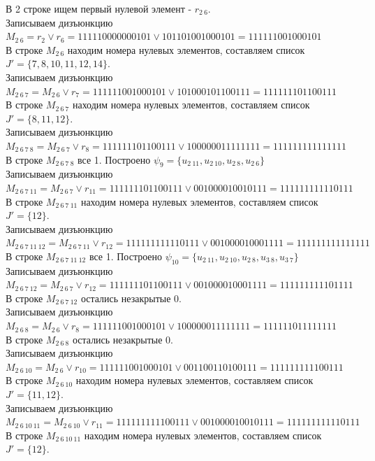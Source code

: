 \documentclass[a4paper,12pt]{article}
\begin{document}
\noindent
В 2 строке ищем первый нулевой элемент - $r_{2\ 6}$.\\
Записываем дизъюнкцию $M_{2\ 6} = r_{2}\lor r_{6} = 111110000000101 \lor 101101001000101 = 111111001000101$\\
В строке $M_{2\ 6}$ находим номера нулевых элементов, составляем список $J' = \{7, 8, 10, 11, 12, 14\}$.\\
Записываем дизъюнкцию $M_{2\ 6\ 7} = M_{2\ 6}\lor r_{7} = 111111001000101 \lor 101000101100111 = 111111101100111$\\
В строке $M_{2\ 6\ 7}$ находим номера нулевых элементов, составляем список $J' = \{8, 11, 12\}$.\\
Записываем дизъюнкцию $M_{2\ 6\ 7\ 8} = M_{2\ 6\ 7}\lor r_{8} = 111111101100111 \lor 100000011111111 = 111111111111111$\\
В строке $M_{2\ 6\ 7\ 8}$ все 1. Построено $\psi_{9} = \{u_{2\ 11},u_{2\ 10},u_{2\ 8},u_{2\ 6}\}$\\
Записываем дизъюнкцию $M_{2\ 6\ 7\ 11} = M_{2\ 6\ 7}\lor r_{11} = 111111101100111 \lor 001000010010111 = 111111111110111$\\
В строке $M_{2\ 6\ 7\ 11}$ находим номера нулевых элементов, составляем список $J' = \{12\}$.\\
Записываем дизъюнкцию $M_{2\ 6\ 7\ 11\ 12} = M_{2\ 6\ 7\ 11}\lor r_{12} = 111111111110111 \lor 001000010001111 = 111111111111111$\\
В строке $M_{2\ 6\ 7\ 11\ 12}$ все 1. Построено $\psi_{10} = \{u_{2\ 11},u_{2\ 10},u_{2\ 8},u_{3\ 8},u_{3\ 7}\}$\\
Записываем дизъюнкцию $M_{2\ 6\ 7\ 12} = M_{2\ 6\ 7}\lor r_{12} = 111111101100111 \lor 001000010001111 = 111111111101111$\\
В строке $M_{2\ 6\ 7\ 12}$ остались незакрытые 0.\\
Записываем дизъюнкцию $M_{2\ 6\ 8} = M_{2\ 6}\lor r_{8} = 111111001000101 \lor 100000011111111 = 111111011111111$\\
В строке $M_{2\ 6\ 8}$ остались незакрытые 0.\\
Записываем дизъюнкцию $M_{2\ 6\ 10} = M_{2\ 6}\lor r_{10} = 111111001000101 \lor 001100110100111 = 111111111100111$\\
В строке $M_{2\ 6\ 10}$ находим номера нулевых элементов, составляем список $J' = \{11, 12\}$.\\
Записываем дизъюнкцию $M_{2\ 6\ 10\ 11} = M_{2\ 6\ 10}\lor r_{11} = 111111111100111 \lor 001000010010111 = 111111111110111$\\
В строке $M_{2\ 6\ 10\ 11}$ находим номера нулевых элементов, составляем список $J' = \{12\}$.\\
\end{document}
